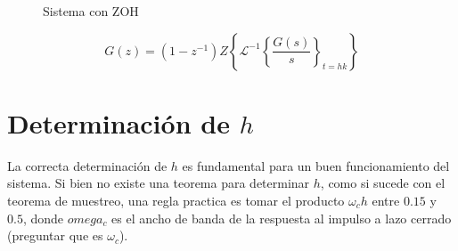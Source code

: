 \begin{figure}
    
    \caption{Sistema con ZOH}
    \label{fig:zoh}
\end{figure}

\begin{equation}
    \label{eq:zoh}
    G(z) = (1 - z^{-1}) Z \left\{ 
        \mathcal{L}^{-1} \left\{ 
            \frac{G(s)}{s}
        \right\}_{t=hk}
    \right\}
\end{equation}

\section{Determinación de $h$}

La correcta determinación de $h$ es fundamental para un buen funcionamiento del sistema. Si bien no existe una teorema para determinar $h$, como si sucede con el teorema de muestreo, 
una regla practica es tomar el producto $\omega_c h$ entre $0.15$ y $0.5$, donde $omega_c$ es el ancho de banda de la respuesta al impulso a lazo cerrado (preguntar que es $\omega_c$).